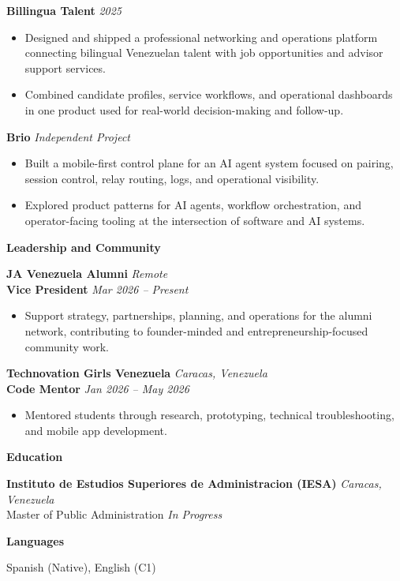 \documentclass[11pt]{article}
\begin{document}
\textbf{Billingua Talent} \hfill \textit{2025}
\begin{itemize}
    \item Designed and shipped a professional networking and operations platform connecting bilingual Venezuelan talent with job opportunities and advisor support services.
    \item Combined candidate profiles, service workflows, and operational dashboards in one product used for real-world decision-making and follow-up.
\end{itemize}

\vspace{6pt}
\textbf{Brio} \hfill \textit{Independent Project}
\begin{itemize}
    \item Built a mobile-first control plane for an AI agent system focused on pairing, session control, relay routing, logs, and operational visibility.
    \item Explored product patterns for AI agents, workflow orchestration, and operator-facing tooling at the intersection of software and AI systems.
\end{itemize}

\vspace{8pt}
\begin{center}
    \textbf{Leadership and Community}
\end{center}
\vspace{-4pt}

\textbf{JA Venezuela Alumni} \hfill \textit{Remote} \\
\textbf{Vice President} \hfill \textit{Mar 2026 -- Present}
\begin{itemize}
    \item Support strategy, partnerships, planning, and operations for the alumni network, contributing to founder-minded and entrepreneurship-focused community work.
\end{itemize}

\vspace{6pt}
\textbf{Technovation Girls Venezuela} \hfill \textit{Caracas, Venezuela} \\
\textbf{Code Mentor} \hfill \textit{Jan 2026 -- May 2026}
\begin{itemize}
    \item Mentored students through research, prototyping, technical troubleshooting, and mobile app development.
\end{itemize}

\vspace{8pt}
\begin{center}
    \textbf{Education}
\end{center}
\vspace{-4pt}

\textbf{Instituto de Estudios Superiores de Administracion (IESA)} \hfill \textit{Caracas, Venezuela} \\
Master of Public Administration \hfill \textit{In Progress}

\vspace{8pt}
\begin{center}
    \textbf{Languages}
\end{center}
\vspace{-4pt}

Spanish (Native), English (C1)
\end{document}
